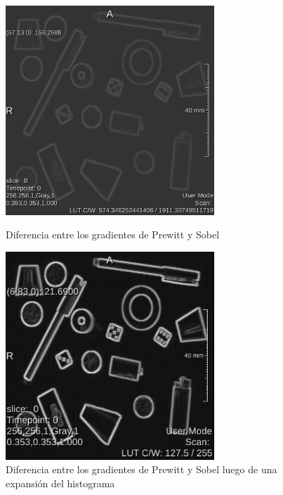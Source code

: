 \documentclass{article}
\begin{document}
\begin{figure}[ht]
\centering
\begin{minipage}{.45\textwidth}
  \centering
    \includegraphics[width=0.7\textwidth]{1Filtros/1_prew_menos_sobel.png} %
\caption{Diferencia entre los gradientes de Prewitt y Sobel}
\label{fg:prewl_menos_sobel}
\end{minipage}%
\begin{minipage}{.45\textwidth}
  \centering
    \includegraphics[width=0.7\textwidth]{1Filtros/1_prew_menos_sobel_scale.png} %
\caption{Diferencia entre los gradientes de Prewitt y Sobel luego de una expansión del histograma}
\label{fg:prewl_menos_sobel_scale}
\end{minipage}
\end{figure}
\FloatBarrier
\end{document}

